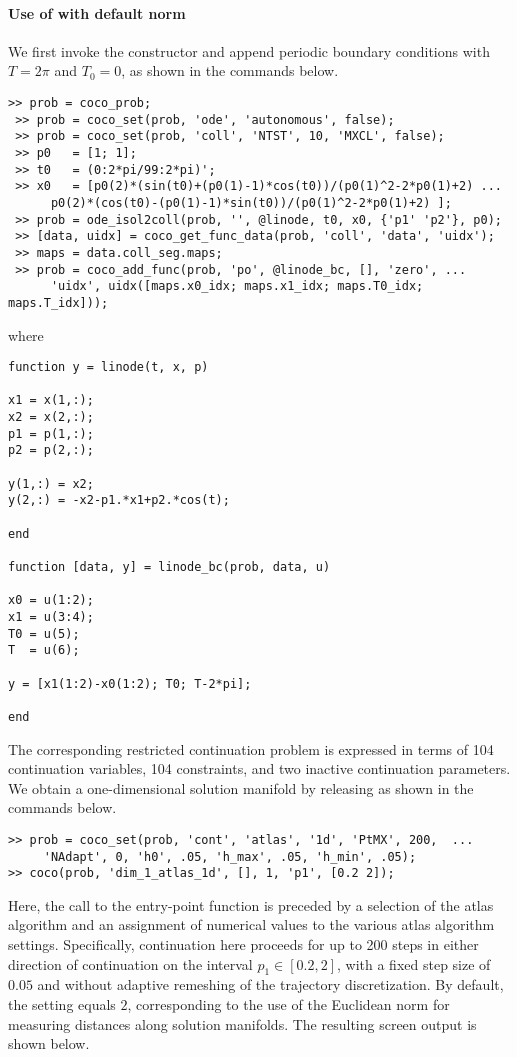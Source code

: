 \paragraph{Use of  with default norm}

We first invoke the  constructor and append periodic boundary conditions with $T=2\pi$ and $T_0=0$, as shown in the commands below.
\begin{lstlisting}[language=coco-highlight]
 >> prob = coco_prob;
 >> prob = coco_set(prob, 'ode', 'autonomous', false);
 >> prob = coco_set(prob, 'coll', 'NTST', 10, 'MXCL', false);
 >> p0   = [1; 1];
 >> t0   = (0:2*pi/99:2*pi)';
 >> x0   = [p0(2)*(sin(t0)+(p0(1)-1)*cos(t0))/(p0(1)^2-2*p0(1)+2) ...
      p0(2)*(cos(t0)-(p0(1)-1)*sin(t0))/(p0(1)^2-2*p0(1)+2) ];
 >> prob = ode_isol2coll(prob, '', @linode, t0, x0, {'p1' 'p2'}, p0);
 >> [data, uidx] = coco_get_func_data(prob, 'coll', 'data', 'uidx');
 >> maps = data.coll_seg.maps;
 >> prob = coco_add_func(prob, 'po', @linode_bc, [], 'zero', ...
      'uidx', uidx([maps.x0_idx; maps.x1_idx; maps.T0_idx; maps.T_idx]));
\end{lstlisting}
where
 \begin{lstlisting}[language=coco-highlight]
function y = linode(t, x, p)

x1 = x(1,:);
x2 = x(2,:);
p1 = p(1,:);
p2 = p(2,:);

y(1,:) = x2;
y(2,:) = -x2-p1.*x1+p2.*cos(t);

end

function [data, y] = linode_bc(prob, data, u)

x0 = u(1:2);
x1 = u(3:4);
T0 = u(5);
T  = u(6);

y = [x1(1:2)-x0(1:2); T0; T-2*pi];

end
\end{lstlisting}
The corresponding restricted continuation problem is expressed in terms of 104 continuation variables, 104 constraints, and two inactive continuation parameters. We obtain a one-dimensional solution manifold by releasing  as shown in the commands below.
 \begin{lstlisting}[language=coco-highlight]
 >> prob = coco_set(prob, 'cont', 'atlas', '1d', 'PtMX', 200,  ...
     'NAdapt', 0, 'h0', .05, 'h_max', .05, 'h_min', .05);
>> coco(prob, 'dim_1_atlas_1d', [], 1, 'p1', [0.2 2]);
\end{lstlisting}
 Here, the call to the  entry-point function is preceded by a selection of the  atlas algorithm and an assignment of numerical values to the various atlas algorithm settings. Specifically, continuation here proceeds for up to 200 steps in either direction of continuation on the interval $p_1\in[0.2,2]$, with a fixed step size of $0.05$ and without adaptive remeshing of the trajectory discretization. By default, the  setting equals $2$, corresponding to the use of the Euclidean norm for measuring distances along solution manifolds. The resulting screen output is shown below.

